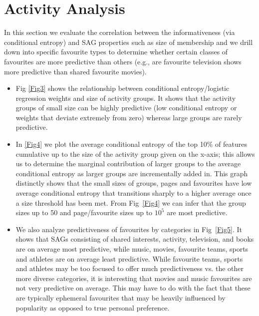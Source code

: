 \section{Activity Analysis}


In this section we evaluate the correlation between the
informativeness (via conditional entropy) and SAG properties such as
size of membership and we drill down into specific favourite types to
determine whether certain classes of favourites are more predictive
than others (e.g., are favourite television shows more predictive than
shared favourite movies).
\begin{itemize}
  \item Fig \ref{Fig3} shows the relationship between conditional
    entropy/logistic regression weights and size of activity
    groups. It shows that the activity groups of small size can be
    highly predictive (low conditional entropy or weights that deviate
    extremely from zero) whereas large groups are rarely predictive.
  \item In \ref{Fig4} we plot the average conditional entropy of the top
    10\% of features cumulative up to the size of the activity group given on the
    x-axis; this allows us to determine the marginal contribution of
    larger groups to the average conditional entropy as larger groups
    are incrementally added in.  This graph 
    distinctly shows that the small sizes of groups, pages and favourites
    have low average conditional entropy that transitions sharply to a
    higher average once a size threshold has been met.  From 
    Fig~\ref{Fig4} we can infer that the group sizes up to 50 and
    page/favourite sizes up to $10^{5}$ are most predictive.
  \item We also analyze predictiveness of favourites by categories in
    Fig~\ref{Fig5}. It shows that SAGs consisting of shared interests,
    activity, television, and books are on average most predictive, while 
    music, movies, favourite teams, sports and athletes are on average
    least predictive.  While favourite teams, sports and athletes may be
    too focused to offer much predictiveness vs. the other more diverse
    categories, it is interesting that movies and music favourites
    are not very predictive on average.  This may have to do with the fact that
    these are typically ephemeral favourites that may be heavily influenced
    by popularity as opposed to true personal preference.
\end{itemize}


